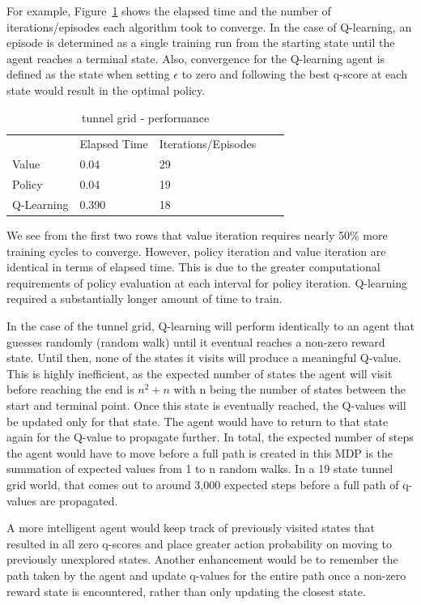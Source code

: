 \documentclass{sig-alternate}
\begin{document}
For example, Figure~\ref{tunnel-performance} shows the elapsed time and the number of iterations/episodes each algorithm took to converge. In the case of Q-learning, an episode is determined as a single training run from the starting state until the agent reaches a terminal state. Also, convergence for the Q-learning agent is defined as the state when setting $\epsilon$ to zero and following the best q-score at each state would result in the optimal policy.


\begin{table}[!htbp]
\begin{tabular}{lllll}
           & Elapsed Time & Iterations/Episodes &  &  \\
Value      & 0.04         & 29                  &  &  \\
Policy     & 0.04         & 19                  &  &  \\
Q-Learning & 0.390        & 18                  &  & 
\end{tabular}
\caption{tunnel grid - performance\label{tunnel-performance}}
\end{table}

We see from the first two rows that value iteration requires nearly 50\% more training cycles to converge. However, policy iteration and value iteration are identical in terms of elapsed time. This is due to the greater computational requirements of policy evaluation at each interval for policy iteration. Q-learning required a substantially longer amount of time to train.

In the case of the tunnel grid, Q-learning will perform identically to an agent that guesses randomly (random walk) until it eventual reaches a non-zero reward state. Until then, none of the states it visits will produce a meaningful Q-value. This is highly inefficient, as the expected number of states the agent will visit before reaching the end is $n^2 + n$ with n being the number of states between the start and terminal point. Once this state is eventually reached, the Q-values will be updated only for that state. The agent would have to return to that state again for the Q-value to propagate further. In total, the expected number of steps the agent would have to move before a full path is created in this MDP is the summation of expected values from 1 to n random walks. In a 19 state tunnel grid world, that comes out to around 3,000 expected steps before a full path of q-values are propagated.

A more intelligent agent would keep track of previously visited states that resulted in all zero q-scores and place greater action probability on moving to previously unexplored states. Another enhancement would be to remember the path taken by the agent and update q-values for the entire path once a non-zero reward state is encountered, rather than only updating the closest state.
\end{document}
